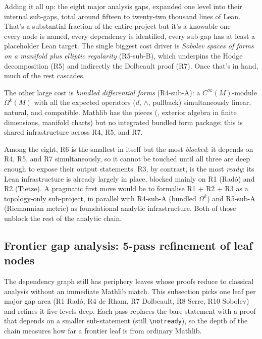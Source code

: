 \bigskip

\begin{layman}
Adding it all up: the eight major analysis gaps, expanded one level
into their internal sub-gaps, total around fifteen to twenty-two
thousand lines of Lean.  That's a substantial fraction of the entire
project but it's a knowable one --- every node is named, every
dependency is identified, every sub-gap has at least a placeholder
Lean target.  The single biggest cost driver is \emph{Sobolev spaces
of forms on a manifold plus elliptic regularity} (R5-sub-B), which
underpins the Hodge decomposition (R5) and indirectly the Dolbeault
proof (R7).  Once that's in hand, much of the rest cascades.

The other large cost is \emph{bundled differential forms}
(R4-sub-A): a \(C^\infty(M)\)-module \(\Omega^k(M)\) with all the
expected operators (\(d\), \(\wedge\), pullback) simultaneously
linear, natural, and compatible.  Mathlib has the pieces
(, exterior algebra in finite dimensions, manifold
charts) but no integrated bundled form package; this is shared
infrastructure across R4, R5, and R7.

Among the eight, R6 is the smallest in itself but the most
\emph{blocked}: it depends on R4, R5, and R7 simultaneously, so it
cannot be touched until all three are deep enough to expose their
output statements.  R3, by contrast, is the most \emph{ready}: its
Lean infrastructure is already largely in place, blocked mainly on
R1 (Rad\'o) and R2 (Tietze).  A pragmatic first move would be to
formalise R1 + R2 + R3 as a topology-only sub-project, in parallel
with R4-sub-A (bundled \(\Omega^k\)) and R5-sub-A (Riemannian
metric) as foundational analytic infrastructure.  Both of those
unblock the rest of the analytic chain.
\end{layman}

\subsection{Frontier gap analysis: 5-pass refinement of leaf nodes}
\label{subsec:frontier-five-pass}

The dependency graph still has periphery leaves whose proofs reduce
to classical analysis without an immediate Mathlib match.  This
subsection picks one leaf per major gap area (R1 Rad\'o, R4 de Rham,
R7 Dolbeault, R8 Serre, R10 Sobolev) and refines it five levels
deep.  Each pass replaces the bare statement with a proof that
depends on a smaller sub-statement (still \texttt{\textbackslash notready}),
so the depth of the chain measures how far a frontier leaf is from
ordinary Mathlib.

